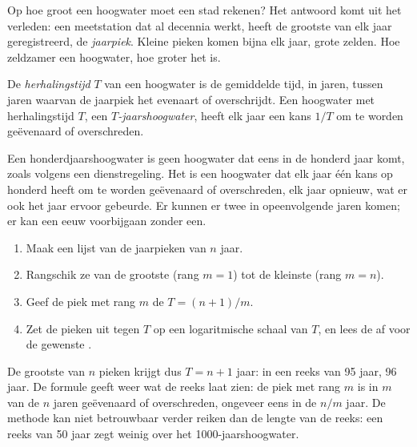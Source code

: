 Op hoe groot een hoogwater moet een stad rekenen? Het antwoord komt uit het
verleden: een meetstation dat al decennia werkt, heeft de grootste  van elk
jaar geregistreerd, de \emph{jaarpiek}. Kleine pieken komen bijna elk jaar, grote
zelden. Hoe zeldzamer een hoogwater, hoe groter het is.

\begin{definition}[Herhalingstijd]\label{def:g10:drainage-basins:return-period}
De \emph{herhalingstijd} $T$ van een hoogwater is de
gemiddelde tijd, in jaren, tussen jaren waarvan de jaarpiek het evenaart of
overschrijdt. Een hoogwater met herhalingstijd $T$, een
\emph{$T$-jaarshoogwater}, heeft elk jaar een kans $1/T$ om te worden
geëvenaard of overschreden.
\end{definition}

Een honderdjaarshoogwater is geen hoogwater dat eens in de honderd jaar komt,
zoals volgens een dienstregeling. Het is een hoogwater dat elk jaar één kans op
honderd heeft om te worden geëvenaard of overschreden, elk jaar opnieuw, wat er
ook het jaar ervoor gebeurde. Er kunnen er twee in opeenvolgende jaren komen; er
kan een eeuw voorbijgaan zonder een.

\begin{method}\label{met:g10:drainage-basins:return-periods}
\begin{enumerate}
  \item Maak een lijst van de jaarpieken van $n$ jaar.
  \item Rangschik ze van de grootste (rang $m = 1$) tot de kleinste
        (rang $m = n$).
  \item Geef de piek met rang $m$ de  $T = (n + 1)/m$.
  \item Zet de pieken uit tegen $T$ op een logaritmische schaal van $T$, en lees
        de  af voor de gewenste .
\end{enumerate}
\end{method}

De grootste van $n$ pieken krijgt dus $T = n + 1$ jaar: in een reeks van
\num{95} jaar, \num{96} jaar. De formule geeft weer wat de reeks laat zien: de
piek met rang $m$ is in $m$ van de $n$ jaren geëvenaard of overschreden,
ongeveer eens in de $n/m$ jaar. De methode kan niet betrouwbaar verder reiken dan
de lengte van de reeks: een reeks van \num{50} jaar zegt weinig over het
\num{1000}-jaarshoogwater.

